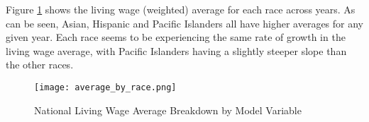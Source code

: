Figure \ref{f:ch4_national_avg_variables} shows the living wage (weighted) average for each race across years. As can be seen, Asian, Hispanic and Pacific Islanders all have higher averages for any given year. Each race seems to be experiencing the same rate of growth in the living wage average, with Pacific Islanders having a slightly steeper slope than the other races.

\begin{figure}[hbt]
    \centering
        \texttt{[image: average\_by\_race.png]}
        \caption{National Living Wage Average Breakdown by Model Variable}
    \label{f:ch4_national_avg_variables}
\end{figure}

